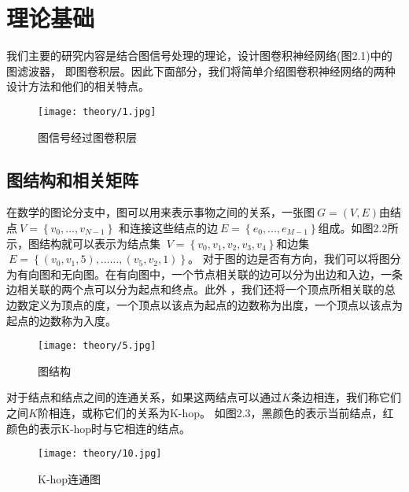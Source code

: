 \cleardoublepage

\section{理论基础}
我们主要的研究内容是结合图信号处理的理论，设计图卷积神经网络(图2.1)中的图滤波器，
即图卷积层。因此下面部分，我们将简单介绍图卷积神经网络的两种设计方法和他们的相关特点。

\begin{figure}[ht]
    \centering
    \texttt{[image: theory/1.jpg]}
    \caption{\label{2-1}图信号经过图卷积层}
\end{figure}

\subsection{图结构和相关矩阵}

在数学的图论分支中，图可以用来表示事物之间的关系，一张图$\ G = (V , E) $由结点$\ V = \left \{ v_{0}, ... ,v_{N-1} \right \} $
和连接这些结点的边$\ E = \left \{ e_{0}, ... ,e_{M-1} \right \} $组成。如图2.2所示，图结构就可以表示为结点集
$\ V = \left \{ v_{0}, v_{1},v_{2},v_{3},v_{4} \right \} $和边集$\ E = \left \{ (v_0,v_1,5), …… ,(v_5,v_2,1) \right \} $。
对于图的边是否有方向，我们可以将图分为有向图和无向图。在有向图中，一个节点相关联的边可以分为出边和入边，一条边相关联的两个点可以分为起点和终点。此外
，我们还将一个顶点所相关联的总边数定义为顶点的度，一个顶点以该点为起点的边数称为出度，一个顶点以该点为起点的边数称为入度。
\begin{figure}[ht]
    \centering
    \texttt{[image: theory/5.jpg]}
    \caption{\label{2-5}图结构}
\end{figure}

对于结点和结点之间的连通关系，如果这两结点可以通过$K$条边相连，我们称它们之间$K$阶相连，或称它们的关系为K-hop。
如图2.3，黑颜色的表示当前结点，红颜色的表示K-hop时与它相连的结点。
\begin{figure}[ht]
    \centering
    \texttt{[image: theory/10.jpg]}
    \caption{\label{2-10}K-hop连通图}
\end{figure}

